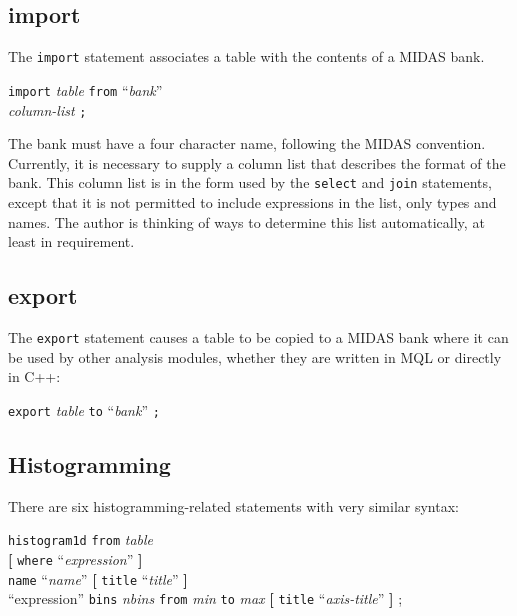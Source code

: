\documentclass[12pt]{article}
\begin{document}
\subsection{import}

The {\tt import} statement associates a table with the contents of a 
MIDAS bank. 

\begin{flushleft}
{\tt import} {\em table} {\tt from} ``{\em bank}'' \\
\hspace{1cm} {\em column-list} {\tt ;}
\end{flushleft}

The bank must have a four character name, following the MIDAS convention.
Currently, it is necessary to supply a column list that describes
the format of the bank.  This column list is in the form used by the 
{\tt select} and {\tt join} statements, except that it is not permitted
to include expressions in the list, only types and names.  The author is
thinking of ways to determine this list automatically, at least in 
requirement. 

\subsection{export}

The {\tt export} statement causes a table to be copied to a MIDAS bank
where it can be used by other analysis modules, whether they are written 
in MQL or directly in C++:

{\tt export} {\em table} {\tt to} ``{\em bank}'' {\tt ;}

\subsection{Histogramming}

There are six histogramming-related statements with very similar syntax:

\begin{flushleft}
{\tt histogram1d} {\tt from} {\em table} \\
\hspace{1cm}  {\bf[} {\tt where} ``{\em expression}'' {\bf]}  \\
\hspace{1cm}  {\tt name} ``{\em name}'' {\bf[} {\tt title} ``{\em title}'' {\bf]} \\
\hspace{1cm}  ``expression'' {\tt bins} {\em nbins} {\tt from} {\em min} {\tt to} {\em max} {\bf[} {\tt title}  ``{\em axis-title}'' {\bf]} ;
\end{flushleft}
\vspace{5mm}
\end{document}
